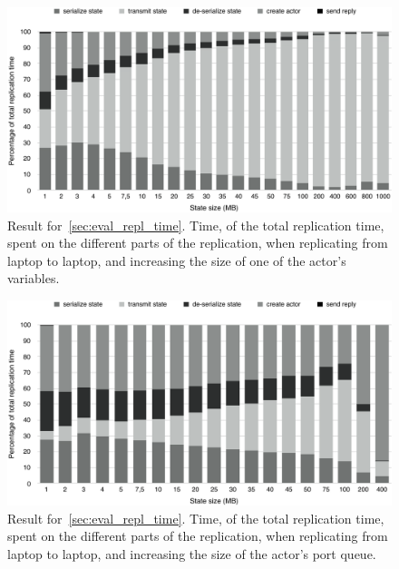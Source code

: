\documentclass{cslthse-msc}
\begin{document}
\begin{figure}[hbt!]
\centering
\includegraphics[scale=0.5]{images/results/replication_time/laptop_parts_variable.pdf} 
\caption[Replication time parts in~\cref{sec:eval_repl_time}, laptop-laptop, increasing variable size]{Result for~\cref{sec:eval_repl_time}. Time, of the total replication time, spent on the different parts of the replication, when replicating from laptop to laptop, and increasing the size of one of the actor's variables.} \label{fig:replication_time_parts_laptop_variable}
\end{figure}

\begin{figure}[hbt!]
\centering
\includegraphics[scale=0.5]{images/results/replication_time/laptop_parts_queue.pdf} 
\caption[Replication time parts in~\cref{sec:eval_repl_time}, laptop-laptop, increasing queue size]{Result for~\cref{sec:eval_repl_time}. Time, of the total replication time, spent on the different parts of the replication, when replicating from laptop to laptop, and increasing the size of the actor's port queue.} \label{fig:replication_time_parts_laptop_queue}
\end{figure}
\end{document}
